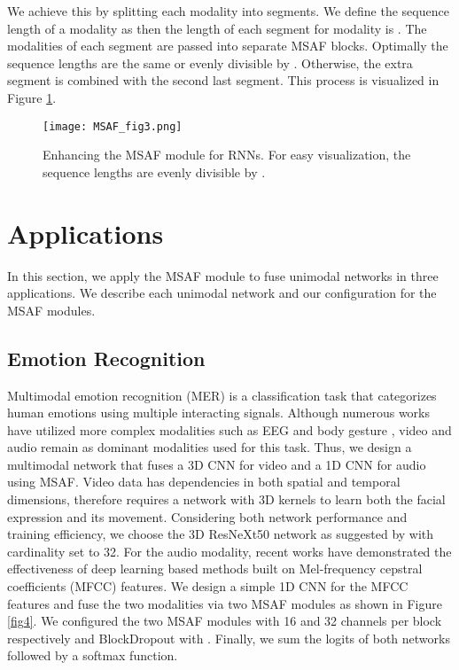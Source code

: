\documentclass[10pt,twocolumn,letterpaper]{article}
\begin{document}
We achieve this by splitting each modality into  segments. We define the sequence length of a modality as  then the length of each segment for modality  is . The modalities of each segment are passed into separate MSAF blocks. Optimally the sequence lengths are the same or evenly divisible by . Otherwise, the extra segment is combined with the second last segment. This process is visualized in Figure \ref{fig3}.

\begin{figure}[t]
\centering
\texttt{[image: MSAF\_fig3.png]} \caption{Enhancing the MSAF module for RNNs. For easy visualization, the sequence lengths are evenly divisible by .}
\label{fig3}
\end{figure}

\section{Applications}
In this section, we apply the MSAF module to fuse unimodal networks in three applications. We describe each unimodal network and our configuration for the MSAF modules.

\subsection{Emotion Recognition}
Multimodal emotion recognition (MER) is a classification task that categorizes human emotions using multiple interacting signals. Although numerous works have utilized more complex modalities such as EEG \cite{zheng2014multimodal} and body gesture \cite{de2006towards}, video and audio remain as dominant modalities used for this task. Thus, we design a multimodal network that fuses a 3D CNN for video and a 1D CNN for audio using MSAF. Video data has dependencies in both spatial and temporal dimensions, therefore requires a network with 3D kernels to learn both the facial expression and its movement. Considering both network performance and training efficiency, we choose the 3D ResNeXt50 network \cite{xie2016aggregated} as suggested by \cite{hara2017can} with cardinality set to 32. For the audio modality, recent works \cite{neverova2015moddrop, wang2020speech} have demonstrated the effectiveness of deep learning based methods built on Mel-frequency cepstral coefficients (MFCC) features. We design a simple 1D CNN for the MFCC features and fuse the two modalities via two MSAF modules as shown in Figure \ref{fig4}. We configured the two MSAF modules with 16 and 32 channels per block respectively and BlockDropout with . Finally, we sum the logits of both networks followed by a softmax function.
\end{document}
